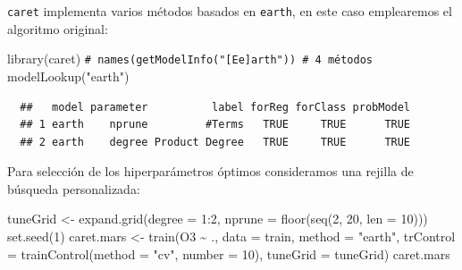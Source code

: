 \documentclass[
]{book}
\newenvironment{Shaded}{\begin{snugshade}}{\end{snugshade}}
\newcommand{\AttributeTok}[1]{\textcolor[rgb]{0.77,0.63,0.00}{#1}}
\newcommand{\CommentTok}[1]{\textcolor[rgb]{0.56,0.35,0.01}{\textit{#1}}}
\newcommand{\DecValTok}[1]{\textcolor[rgb]{0.00,0.00,0.81}{#1}}
\newcommand{\FunctionTok}[1]{\textcolor[rgb]{0.00,0.00,0.00}{#1}}
\newcommand{\NormalTok}[1]{#1}
\newcommand{\OtherTok}[1]{\textcolor[rgb]{0.56,0.35,0.01}{#1}}
\newcommand{\SpecialCharTok}[1]{\textcolor[rgb]{0.00,0.00,0.00}{#1}}
\newcommand{\StringTok}[1]{\textcolor[rgb]{0.31,0.60,0.02}{#1}}
\theoremstyle{break}
\theoremstyle{nonumberplain}
\renewcommand{\CommentTok}[1]{\textcolor[rgb]{0.41,0.41,0.41}{\texttt{#1}}}
\begin{document}
\texttt{caret} implementa varios métodos basados en \texttt{earth}, en este caso emplearemos el algoritmo original:

\begin{Shaded}
\begin{Highlighting}[]
\FunctionTok{library}\NormalTok{(caret)}
\CommentTok{\# names(getModelInfo("[Ee]arth")) \# 4 métodos}
\FunctionTok{modelLookup}\NormalTok{(}\StringTok{"earth"}\NormalTok{)}
\end{Highlighting}
\end{Shaded}

\begin{verbatim}
  ##   model parameter          label forReg forClass probModel
  ## 1 earth    nprune         #Terms   TRUE     TRUE      TRUE
  ## 2 earth    degree Product Degree   TRUE     TRUE      TRUE
\end{verbatim}

Para selección de los hiperparámetros óptimos consideramos una rejilla de búsqueda personalizada:



\begin{Shaded}
\begin{Highlighting}[]
\NormalTok{tuneGrid }\OtherTok{\textless{}{-}} \FunctionTok{expand.grid}\NormalTok{(}\AttributeTok{degree =} \DecValTok{1}\SpecialCharTok{:}\DecValTok{2}\NormalTok{, }
                       \AttributeTok{nprune =} \FunctionTok{floor}\NormalTok{(}\FunctionTok{seq}\NormalTok{(}\DecValTok{2}\NormalTok{, }\DecValTok{20}\NormalTok{, }\AttributeTok{len =} \DecValTok{10}\NormalTok{)))}
\FunctionTok{set.seed}\NormalTok{(}\DecValTok{1}\NormalTok{)}
\NormalTok{caret.mars }\OtherTok{\textless{}{-}} \FunctionTok{train}\NormalTok{(O3 }\SpecialCharTok{\textasciitilde{}}\NormalTok{ ., }\AttributeTok{data =}\NormalTok{ train, }\AttributeTok{method =} \StringTok{"earth"}\NormalTok{,}
    \AttributeTok{trControl =} \FunctionTok{trainControl}\NormalTok{(}\AttributeTok{method =} \StringTok{"cv"}\NormalTok{, }\AttributeTok{number =} \DecValTok{10}\NormalTok{),}
    \AttributeTok{tuneGrid =}\NormalTok{ tuneGrid)}
\NormalTok{caret.mars}
\end{Highlighting}
\end{Shaded}
\end{document}

